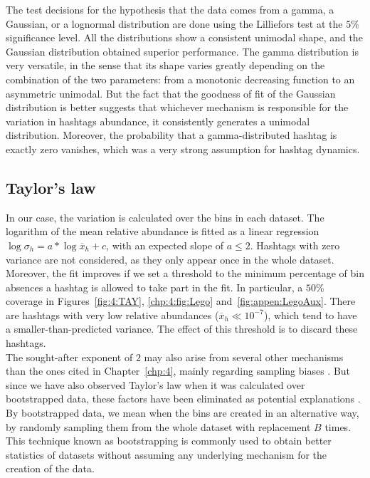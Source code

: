  The test decisions for the hypothesis that the data comes from a gamma, a Gaussian, or a lognormal distribution are done using the Lilliefors test at the $5\%$ significance level. All the distributions show a consistent unimodal shape, and the Gaussian distribution obtained superior performance. The gamma distribution is very versatile, in the sense that its shape varies greatly depending on the combination of the two parameters: from a monotonic decreasing function to an asymmetric unimodal. But the fact that the goodness of fit of the Gaussian distribution is better suggests that whichever mechanism is responsible for the variation in hashtags abundance, it consistently generates a unimodal distribution. Moreover, the probability that a gamma-distributed hashtag is exactly zero vanishes, which was a very strong assumption for hashtag dynamics. 
 

\subsection{Taylor's law} In our case, the variation is calculated over the bins in each dataset. The logarithm of the mean relative abundance is fitted as a linear regression $\log{\sigma_h} = a*\log{\overline{x}_h} + c$, with an expected slope of $a \leq2$. Hashtags with zero variance are not considered, as they only appear once in the whole dataset. Moreover, the fit improves if we set a threshold to the minimum percentage of bin absences a hashtag is allowed to take part in the fit. In particular, a $50\%$ coverage in Figures~\ref{fig:4:TAY}, \ref{chp:4:fig:Lego} and~\ref{fig:appen:LegoAux}. There are hashtags with very low relative abundances ($\overline{x}_h \ll 10^{-7}$), which tend to have a smaller-than-predicted variance. The effect of this threshold is to discard  these hashtags.\\

The sought-after exponent of $2$ may also arise from several other mechanisms than the ones cited in Chapter~\ref{chp:4}, mainly regarding sampling biases \cite{taylor1961aggregation}. But since we have also observed Taylor's law when it was calculated over bootstrapped data, these factors have been eliminated as potential explanations \cite{grilli2020macroecological}. By bootstrapped data, we mean when the bins are created in an alternative way, by randomly sampling them from the whole dataset with replacement $B$ times. This technique known as bootstrapping is commonly used to obtain better statistics of datasets without assuming any underlying mechanism for the creation of the data. \\

